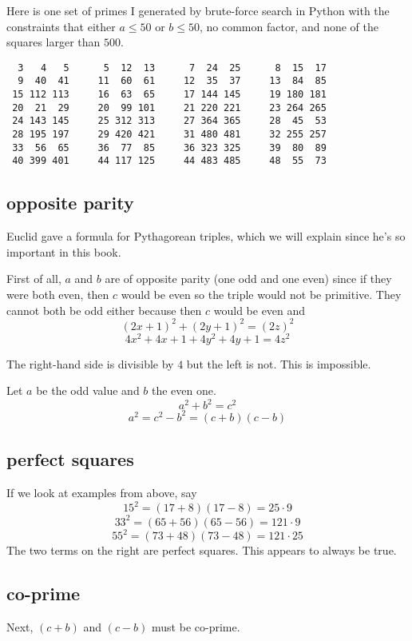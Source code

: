 \documentclass[11pt, oneside]{article}
\begin{document}
Here is one set of primes I generated by brute-force search in Python with the constraints that either $a \le 50$ or $b \le 50$, no common factor, and none of the squares larger than $500$.

\begin{verbatim}
  3   4   5      5  12  13      7  24  25      8  15  17   
  9  40  41     11  60  61     12  35  37     13  84  85   
 15 112 113     16  63  65     17 144 145     19 180 181   
 20  21  29     20  99 101     21 220 221     23 264 265   
 24 143 145     25 312 313     27 364 365     28  45  53   
 28 195 197     29 420 421     31 480 481     32 255 257   
 33  56  65     36  77  85     36 323 325     39  80  89   
 40 399 401     44 117 125     44 483 485     48  55  73   
\end{verbatim}

\subsection*{opposite parity}
Euclid gave a formula for Pythagorean triples, which we will explain since he's so important in this book.

First of all, $a$ and $b$ are of opposite parity (one odd and one even) since if they were both even, then $c$ would be even so the triple would not be primitive.  They cannot both be odd either because then $c$ would be even and 
\[ (2x + 1)^2 + (2y + 1)^2 = (2z)^2 \]
\[ 4x^2 + 4x + 1 + 4y^2 + 4y + 1 = 4z^2 \]

The right-hand side is divisible by $4$ but the left is not.  This is impossible.  

Let $a$ be the odd value and $b$ the even one.
\[ a^2 + b^2 = c^2 \]
\[ a^2 = c^2 - b^2 = (c + b)(c - b) \]

\subsection*{perfect squares}

If we look at examples from above, say
\[ 15^2 = (17 + 8)(17 - 8) = 25 \cdot 9 \]
\[ 33^2 = (65 + 56)(65 - 56) = 121 \cdot 9 \]
\[ 55^2 = (73 + 48)(73 - 48) = 121 \cdot 25 \]
The two terms on the right are perfect squares.  This appears to always be true.

\subsection*{co-prime}

Next, $(c + b)$ and $(c - b)$ must be co-prime.
\end{document}

